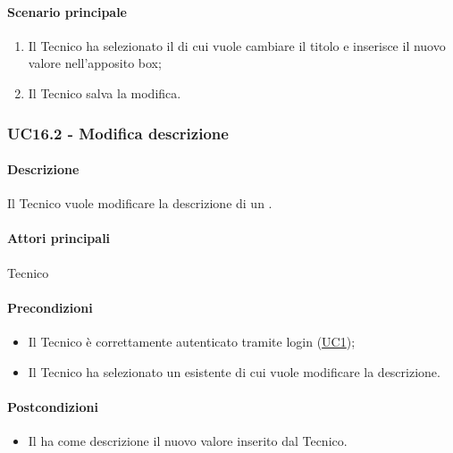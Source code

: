\paragraph*{Scenario principale}
\begin{enumerate}
  \item Il Tecnico ha selezionato il  di cui vuole cambiare il titolo e inserisce il nuovo valore nell’apposito box;
  \item Il Tecnico salva la modifica.
\end{enumerate}


\subsubsection{UC16.2 - Modifica descrizione }\label{UC16point2}
\paragraph*{Descrizione}
Il Tecnico vuole modificare la descrizione di un .

\paragraph*{Attori principali}
Tecnico

\paragraph*{Precondizioni}
\begin{itemize}
  \item Il Tecnico è correttamente autenticato tramite login (\hyperref[UC1]{UC1});
  \item Il Tecnico ha selezionato un  esistente di cui vuole modificare la descrizione.
\end{itemize}

\paragraph*{Postcondizioni}
\begin{itemize}
  \item Il  ha come descrizione il nuovo valore inserito dal Tecnico.
\end{itemize}

